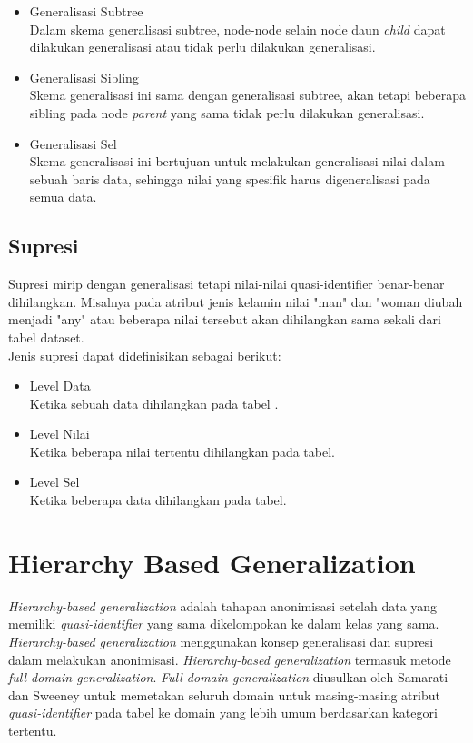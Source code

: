 \begin{itemize}
\item Generalisasi Subtree\\
Dalam skema generalisasi subtree, node-node selain node daun \textit{child} dapat dilakukan generalisasi atau tidak perlu dilakukan generalisasi. 

\item Generalisasi Sibling\\
Skema generalisasi ini sama dengan generalisasi subtree, akan tetapi beberapa sibling pada node \textit{parent} yang sama tidak perlu dilakukan generalisasi. 

\item Generalisasi Sel\\
Skema generalisasi ini bertujuan untuk melakukan generalisasi nilai dalam sebuah baris data, sehingga nilai yang spesifik harus digeneralisasi pada semua data.

\end{itemize}

\subsection{Supresi}
Supresi mirip dengan generalisasi tetapi nilai-nilai quasi-identifier benar-benar dihilangkan. Misalnya pada atribut jenis kelamin nilai "man" dan "woman diubah menjadi "any" atau beberapa nilai tersebut akan dihilangkan sama sekali dari tabel dataset. \\

\noindent Jenis supresi dapat didefinisikan sebagai berikut:
\begin{itemize}
\item Level Data\\
Ketika sebuah data dihilangkan pada tabel .
\item Level Nilai\\
Ketika beberapa nilai tertentu dihilangkan pada tabel.
\item Level Sel\\
Ketika beberapa data dihilangkan pada tabel.
\end{itemize}

\section{Hierarchy Based Generalization} 
\label{theory:hierarchy_generalization}
\textit{Hierarchy-based generalization} adalah tahapan anonimisasi setelah data yang memiliki \textit{quasi-identifier} yang sama dikelompokan ke dalam kelas yang sama. \textit{Hierarchy-based generalization} menggunakan konsep generalisasi dan supresi dalam melakukan anonimisasi. \textit{Hierarchy-based generalization} termasuk metode \textit{full-domain generalization}. \textit{Full-domain generalization} diusulkan oleh Samarati dan Sweeney untuk memetakan seluruh domain untuk masing-masing atribut \textit{quasi-identifier} pada tabel ke domain yang lebih umum berdasarkan kategori tertentu.

